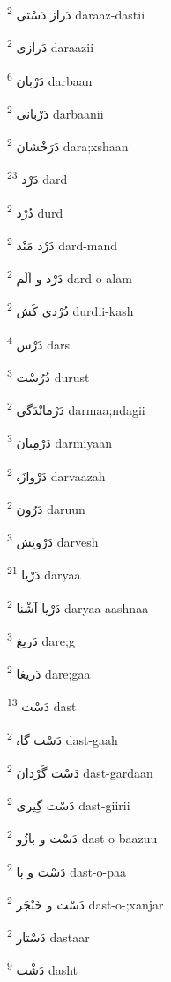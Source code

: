 \documentclass[12pt]{article}
\begin{document}
\begin{RTL}
\begin{multicols}{5}
{\ur دَراز دَسْتی}   \textsuperscript{2} daraaz-dastii

{\ur دَرازی}   \textsuperscript{2} daraazii

{\ur دَرْبان}   \textsuperscript{6} darbaan

{\ur دَرْبانی}   \textsuperscript{2} darbaanii

{\ur دَرَخْشان}   \textsuperscript{2} dara;xshaan

{\ur دَرْد}   \textsuperscript{23} dard

{\ur دُرْد}   \textsuperscript{2} durd

{\ur دَرْد مَنْد}   \textsuperscript{2} dard-mand

{\ur دَرْد و اَلَم}   \textsuperscript{2} dard-o-alam

{\ur دُرْدی کَش}   \textsuperscript{2} durdii-kash

{\ur دَرْس}   \textsuperscript{4} dars

{\ur دُرُسْت}   \textsuperscript{3} durust

{\ur دَرْمانْدَگی}   \textsuperscript{2} darmaa;ndagii

{\ur دَرْمِیان}   \textsuperscript{3} darmiyaan

{\ur دَرْوازَہ}   \textsuperscript{2} darvaazah

{\ur دَرُون}   \textsuperscript{2} daruun

{\ur دَرْویش}   \textsuperscript{3} darvesh

{\ur دَرْیا}   \textsuperscript{21} daryaa

{\ur دَرْیا آشْنا}   \textsuperscript{2} daryaa-aashnaa

{\ur دَریغ}   \textsuperscript{3} dare;g

{\ur دَریغا}   \textsuperscript{2} dare;gaa

{\ur دَسْت}   \textsuperscript{13} dast

{\ur دَسْت گاہ}   \textsuperscript{2} dast-gaah

{\ur دَسْت گَرْدان}   \textsuperscript{2} dast-gardaan

{\ur دَسْت گِیری}   \textsuperscript{2} dast-giirii

{\ur دَسْت و بازُو}   \textsuperscript{2} dast-o-baazuu

{\ur دَسْت و پا}   \textsuperscript{2} dast-o-paa

{\ur دَسْت و خَنْجَر}   \textsuperscript{2} dast-o-;xanjar

{\ur دَسْتار}   \textsuperscript{2} dastaar

{\ur دَشْت}   \textsuperscript{9} dasht


\end{multicols}
\end{RTL}
\end{document}
